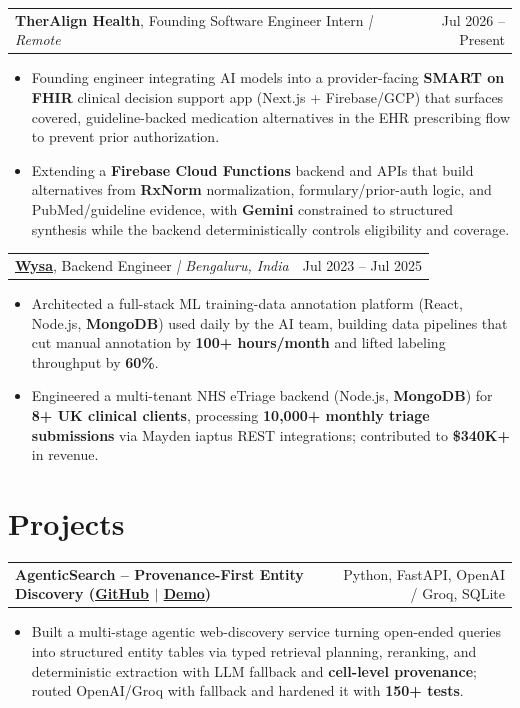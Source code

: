 \documentclass[letterpaper,11pt]{article}
\makeatletter
\newcommand{\expItem}[4]{%
  \vspace{2pt}
  \begin{tabular*}{\textwidth}{@{}l@{\extracolsep{\fill}}r@{}}
    \textbf{#1}, #2 \textit{| #3} & #4 \\
  \end{tabular*}\par\vspace{-3pt}
}
\newcommand{\projItem}[2]{%
  \vspace{2pt}
  \begin{tabular*}{\textwidth}{@{}l@{\extracolsep{\fill}}r@{}}
    \textbf{#1} & #2 \\
  \end{tabular*}\par\vspace{-3pt}
}
\makeatother
\begin{document}
\expItem{TherAlign Health}{Founding Software Engineer Intern}{Remote}{Jul 2026 -- Present}
\begin{itemize}
  \item Founding engineer integrating AI models into a provider-facing \textbf{SMART on FHIR} clinical decision support app (Next.js + Firebase/GCP) that surfaces covered, guideline-backed medication alternatives in the EHR prescribing flow to prevent prior authorization.
  \item Extending a \textbf{Firebase Cloud Functions} backend and APIs that build alternatives from \textbf{RxNorm} normalization, formulary/prior-auth logic, and PubMed/guideline evidence, with \textbf{Gemini} constrained to structured synthesis while the backend deterministically controls eligibility and coverage.
\end{itemize}

\expItem{\href{https://www.wysa.io}{Wysa}}{Backend Engineer}{Bengaluru, India}{Jul 2023 -- Jul 2025}
\begin{itemize}
  \item Architected a full-stack ML training-data annotation platform (React, Node.js, \textbf{MongoDB}) used daily by the AI team, building data pipelines that cut manual annotation by \textbf{100+ hours/month} and lifted labeling throughput by \textbf{60\%}.
  \item Engineered a multi-tenant NHS eTriage backend (Node.js, \textbf{MongoDB}) for \textbf{8+ UK clinical clients}, processing \textbf{10{,}000+ monthly triage submissions} via Mayden iaptus REST integrations; contributed to \textbf{\$340K+} in revenue.
\end{itemize}

\section{Projects}

\projItem{AgenticSearch -- Provenance-First Entity Discovery {\normalfont\small(\href{https://github.com/Deva-1903/ciir_agentic_search}{GitHub} $\vert$ \href{https://agentic-search-negglszkwa-uc.a.run.app}{Demo})}}{Python, FastAPI, OpenAI / Groq, SQLite}
\begin{itemize}
  \item Built a multi-stage agentic web-discovery service turning open-ended queries into structured entity tables via typed retrieval planning, reranking, and deterministic extraction with LLM fallback and \textbf{cell-level provenance}; routed OpenAI/Groq with fallback and hardened it with \textbf{150+ tests}.
\end{itemize}
\end{document}
